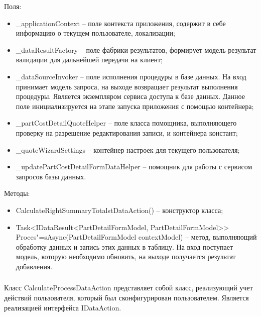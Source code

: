 Поля:
\begin{itemize}
  \item \_applicationContext – поле контекста приложения, содержит в себе информацию о текущем пользователе, локализации;
  \item \_dataResultFactory – поле фабрики результатов, формирует модель результат валидации для дальнейшей передачи на клиент;
  \item \_dataSourceInvoker – поле исполнения процедуры в базе данных. На вход принимает модель запроса, на выходе возвращает результат выполнения процедуры. Является экземпляром сервиса доступа к базе данных. Данное поле инициализируется на этапе запуска приложения с помощью контейнера;
  \item \_partCostDetailQuoteHelper – поле класса помощника, выполняющего проверку на разрешение редактирования записи, и контейнера констант;
  \item \_quoteWizardSettings – контейнер настроек для текущего пользователя;
  \item \_updatePartCostDetailFormDataHelper – помощник для работы с сервисом запросов базы данных.
\end{itemize}

Методы:
\begin{itemize}
  \item CalculateRightSummaryTotalstDataAction() – конструктор класса;
  \item Task<IDataResult<PartDetailFormModel, PartDetailFormModel>> Proces"=sAsync(PartDetailFormModel contextModel) – метод, выполняющий обработку данных и запись этих данных в таблицу. На вход поступает модель, которую необходимо обновить, на выходе получается результат добавления.
\end{itemize}

\subsubsection{}
\label{sub:arch_and_mod:data_layer:calculate_process}

Класс CalculateProcessDataAction представляет собой класс, реализующий учет действий пользователя, который был сконфигурирован пользователем. Является реализацией интерфейса IDataAction.

